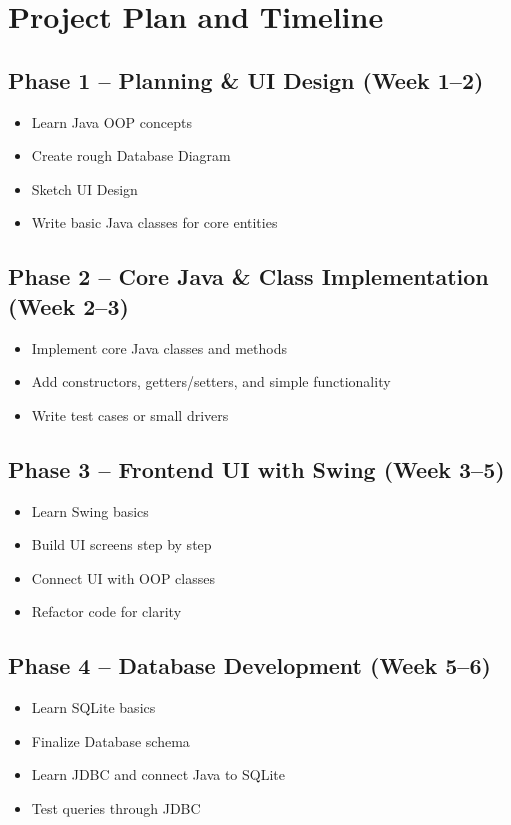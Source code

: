 \documentclass[12pt,a4paper]{article}
\begin{document}
\section*{Project Plan and Timeline}
\subsection*{Phase 1 – Planning \& UI Design (Week 1–2)}
\begin{itemize}
  \item Learn Java OOP concepts
  \item Create rough Database Diagram
  \item Sketch UI Design
  \item Write basic Java classes for core entities
\end{itemize}

\subsection*{Phase 2 – Core Java \& Class Implementation (Week 2–3)}
\begin{itemize}
  \item Implement core Java classes and methods
  \item Add constructors, getters/setters, and simple functionality
  \item Write test cases or small drivers
\end{itemize}

\subsection*{Phase 3 – Frontend UI with Swing (Week 3–5)}
\begin{itemize}
  \item Learn Swing basics
  \item Build UI screens step by step
  \item Connect UI with OOP classes
  \item Refactor code for clarity
\end{itemize}

\subsection*{Phase 4 – Database Development (Week 5–6)}
\begin{itemize}
  \item Learn SQLite basics
  \item Finalize Database schema
  \item Learn JDBC and connect Java to SQLite
  \item Test queries through JDBC
\end{itemize}
\end{document}
